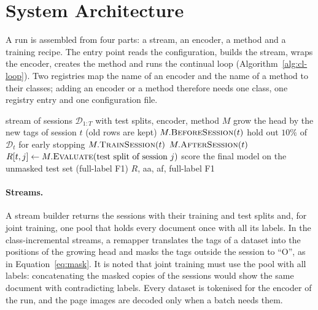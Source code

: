 \section{System Architecture}
\label{sec:c4-s2}

A run is assembled from four parts: a stream, an encoder, a method and a training recipe.
The entry point reads the configuration, builds the stream, wraps the encoder, creates the
method and runs the continual loop (Algorithm~\ref{alg:cl-loop}). Two registries map the
name of an encoder and the name of a method to their classes; adding an encoder or a method
therefore needs one class, one registry entry and one configuration file.

\begin{algorithm}[!htbp]
  \caption{The continual loop shared by all methods}
  \label{alg:cl-loop}
  \begin{algorithmic}[1]
    \Require stream of sessions $\mathcal{D}_{1:T}$ with test splits, encoder, method $M$
      \State grow the head by the new tags of session $t$ (old rows are kept)
      \State $M.\textsc{BeforeSession}(t)$
      \State hold out $10\%$ of $\mathcal{D}_t$ for early stopping
      \State $M.\textsc{TrainSession}(t)$ 
      \State $M.\textsc{AfterSession}(t)$ 
        \State $R[t,j]\gets M.\textsc{Evaluate}(\text{test split of session } j)$
      \EndFor
    \EndFor
    \State score the final model on the unmasked test set (full-label F1)
    \State \Return $R$, \gls{aa}, \gls{af}, full-label F1
  \end{algorithmic}
\end{algorithm}

\paragraph{Streams.} A stream builder returns the sessions with their training and test
splits and, for joint training, one pool that holds every document once with all its
labels. In the class-incremental streams, a remapper translates the tags of a dataset into
the positions of the growing head and masks the tags outside the session to ``O'', as in
Equation~\eqref{eq:mask}. It is noted that joint training must use the pool with all
labels: concatenating the masked copies of the sessions would show the same document with
contradicting labels. Every dataset is tokenised for the encoder of the run, and the page
images are decoded only when a batch needs them.

